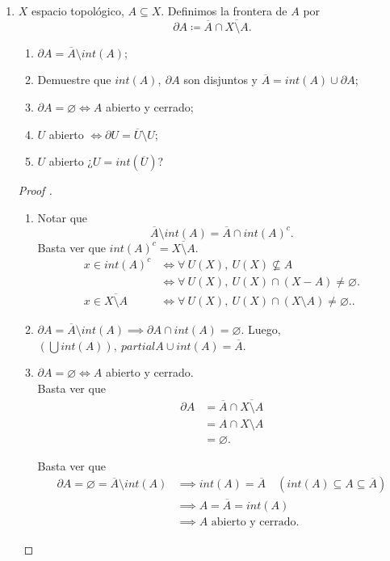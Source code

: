 \begin{enumerate}
	\item $X$ espacio topológico, $A \subseteq X$. Definimos la frontera de $A$ por
	\[
	\partial A \coloneq \overline{A} \cap \overline{X \setminus A}.
	\]
	\begin{enumerate}
		\item $\partial A = \overline{A} \setminus int(A)$;

		\item Demuestre que $int(A),\ \partial A$ son disjuntos y $\overline{A} = int(A) \cup \partial A$;

		\item $\partial A = \varnothing \iff A$ abierto y cerrado;

		\item $U$ abierto $\iff \partial U = \overline{U} \setminus U$;

		\item $U$ abierto ¿$U = int(\overline{U})$?
	\end{enumerate}
	\begin{proof}[Proof ]
		\begin{enumerate}
			\item Notar que
			\[
			\overline{A} \setminus int(A) = \overline{A} \cap int(A)^c.
			\]
			Basta ver que $int(A)^c = \overline{X \setminus A}$.
			\begin{align*}
				x \in int(A)^c & \iff \forall \ U(X),\ U(X) \not\subseteq A \\
				& \iff \forall \ U(X),\ U(X) \cap (X-A) \neq \varnothing. \\
				x \in \overline{X \setminus A} & \iff \forall \ U(X),\ U(X) \cap (X \setminus A) \neq \varnothing.
			.\end{align*}

			\item $\partial A = \overline{A} \setminus int(A) \implies \partial A \cap int(A) = \varnothing$. Luego, $(\bigcup int(A)),\ partial A \cup int(A) = \overline{A}$.

			\item $\partial A = \varnothing \iff A$ abierto y cerrado.\\
			\Onlyifstep Basta ver que \begin{align*}
				\partial A & = \overline{A} \cap \overline{X \setminus A} \\
				& = A \cap X \setminus A \\
				& = \varnothing.
			\end{align*}

			\Ifstep Basta ver que
			\begin{align*}
				\partial A = \varnothing = \overline{A}\setminus int(A) & \implies int(A) = \overline{A} \quad (int(A) \subseteq A \subseteq \overline{A}) \\
				& \implies A = \overline{A} = int(A) \\
				& \implies A \text{ abierto y cerrado}
			.\end{align*}


\end{enumerate}
\end{proof}
\end{enumerate}
